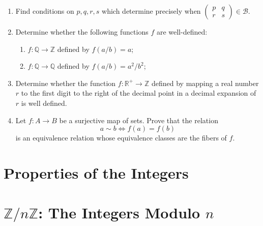 \begin{enumerate}
    \item Find conditions on $p,q,r,s$ which determine precisely when $\begin{pmatrix}
        p&q\\r&s
    \end{pmatrix}\in\mathcal{B}$.
    \item Determine whether the following functions $f$ are well-defined:
    \begin{enumerate}
        \item $f : \mathbb{Q} \to \mathbb{Z}$ defined by $f(a/b) = a$;
        \item $f : \mathbb{Q} \to \mathbb{Q}$ defined by $f(a/b) = a^2/b^2$;

    \end{enumerate}
    \item Determine whether the function $f : \mathbb{R}^+ \to \mathbb{Z}$ defined by mapping a real number $r$ to the first digit to the right of the decimal point in a decimal expansion of $r$ is well defined.
    
    \item Let $f: A \to B$ be a surjective map of sets. Prove that the relation
    \[
        a \sim b \iff f(a) = f(b)
    \]
    is an equivalence relation whose equivalence classes are the fibers of $f$.
\end{enumerate}

\section{Properties of the Integers}

\section{$\mathbb{Z}/n\mathbb{Z}$: The Integers Modulo $n$}